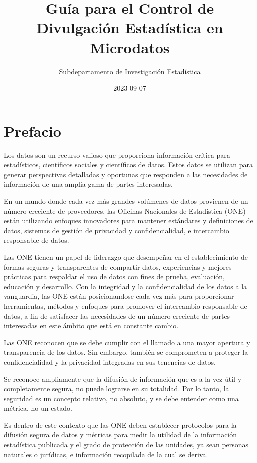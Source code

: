 \documentclass[]{book}
\title{Guía para el Control de Divulgación Estadística en Microdatos}
\author{Subdepartamento de Investigación Estadística}
\date{2023-09-07}
\theoremstyle{definition}
\theoremstyle{definition}
\theoremstyle{definition}
\theoremstyle{definition}
\theoremstyle{remark}
\begin{document}
\maketitle

{
\hypersetup{linkcolor=}
\setcounter{tocdepth}{1}
\tableofcontents
}
\hypertarget{prefacio}{%
\chapter{Prefacio}\label{prefacio}}

Los datos son un recurso valioso que proporciona información crítica para estadísticos, científicos sociales y científicos de datos. Estos datos se utilizan para generar perspectivas detalladas y oportunas que responden a las necesidades de información de una amplia gama de partes interesadas.

En un mundo donde cada vez más grandes volúmenes de datos provienen de un número creciente de proveedores, las Oficinas Nacionales de Estadística (ONE) están utilizando enfoques innovadores para mantener estándares y definiciones de datos, sistemas de gestión de privacidad y confidencialidad, e intercambio responsable de datos.

Las ONE tienen un papel de liderazgo que desempeñar en el establecimiento de formas seguras y transparentes de compartir datos, experiencias y mejores prácticas para respaldar el uso de datos con fines de prueba, evaluación, educación y desarrollo. Con la integridad y la confidencialidad de los datos a la vanguardia, las ONE están posicionandose cada vez más para proporcionar herramientas, métodos y enfoques para promover el intercambio responsable de datos, a fin de satisfacer las necesidades de un número creciente de partes interesadas en este ámbito que está en constante cambio.

Las ONE reconocen que se debe cumplir con el llamado a una mayor apertura y transparencia de los datos. Sin embargo, también se comprometen a proteger la confidencialidad y la privacidad integradas en sus tenencias de datos.

Se reconoce ampliamente que la difusión de información que es a la vez útil y completamente segura, no puede lograrse en su totalidad. Por lo tanto, la seguridad es un concepto relativo, no absoluto, y se debe entender como una métrica, no un estado.

Es dentro de este contexto que las ONE deben establecer protocolos para la difusión segura de datos y métricas para medir la utilidad de la información estadística publicada y el grado de protección de las unidades, ya sean personas naturales o jurídicas, e información recopilada de la cual se deriva.
\end{document}
